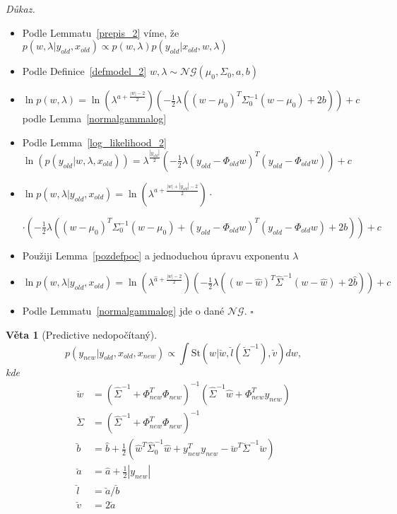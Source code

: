 \documentclass{article}
\newenvironment{pitemize}{
\begin{itemize}
  \setlength{\itemsep}{5pt}
  \setlength{\parskip}{0pt}
  \setlength{\parsep}{0pt}
}{\end{itemize}}
\newenvironment{pproof}{
\noindent\emph{Důkaz.}
\begin{pitemize}
}{\hfill$\square$\end{pitemize}}
\newcommand{\NoG}{\mathcal{NG}}
\newcommand{\St}{\mathrm{St}}
\newtheorem{veta}{Věta}
\theoremstyle{definition}
\begin{document}
\begin{pproof}
\item Podle Lemmatu~\ref{prepis_2} víme, že $p(w,\lambda|y_{old},x_{old})\propto p(w,\lambda)p(y_{old}|x_{old},w,\lambda)$
 
\item Podle Definice~\ref{defmodel_2} $w,\lambda\sim\NoG(\mu_0,\Sigma_0,a,b)$ 
\item $\ln p(w,\lambda)=
\ln\left(\lambda^{a+\frac{\left|w\right|-2}{2}}\right)
\left(-\frac{1}{2}\lambda\left(\left(w-\mu_0\right)^T \Sigma_0^{-1}\left(w- \mu_0\right)+2b\right)\right)+c$ podle Lemma~\ref{normalgammalog} 

\item Podle Lemma~\ref{log_likelihood_2} $\ln(p(y_{old}|w,\lambda,x_{old}))=\lambda^{\frac{\left|y_{old}\right|}{2}}\left(-\frac{1}{2}\lambda
\left(y_{old}-\Phi _{old}w\right)^T\left(y_{old}-\Phi _{old}w\right)\right)+c$

\item $\ln p(w,\lambda|y_{old},x_{old})=
\ln\left(\lambda^{a+\frac{\left|w\right|+\left|y_{old}\right|-2}{2}}\right)\cdot$

\nopagebreak

$\cdot\left(-\frac{1}{2}\lambda\left(\left(w-\mu_0\right)^T \Sigma_0^{-1}\left(w- \mu_0\right)+\left(y_{old}-\Phi _{old}w\right)^T\left(y_{old}-\Phi _{old}w\right)+2b\right)\right)+c
$

\item Použiji Lemma~\ref{pozdefpoc} a jednoduchou úpravu exponentu $\lambda$

\item $\ln p(w,\lambda|y_{old},x_{old})=
\ln\left(\lambda^{\hat{a}+\frac{\left|w\right|-2}{2}}\right) \left(-\frac{1}{2}\lambda\left(\left(w-\hat{w}\right)^T {\hat{\Sigma}}^{-1}\left(w- \hat{w}\right)+2\hat{b}\right)\right)+c
$
\item Podle Lemmatu~\ref{normalgammalog} jde o dané $\NoG$.
\end{pproof}

\begin{veta}[Predictive nedopočítaný]
$$p(y_{new}|y_{old},x_{old},x_{new})\propto\int\St\left(w|\breve w,\breve l\left(\breve \Sigma^{-1}\right),\breve v\right) dw,$$
kde 
\begin{align*}
\breve{w} &= (\hat \Sigma^{-1}+\Phi _{new}^T\Phi _{new})^{-1}(\hat \Sigma^{-1}\hat w+\Phi _{new}^Ty_{new}) \\
\breve{\Sigma} &= (\hat \Sigma^{-1}+\Phi _{new}^T\Phi _{new})^{-1} \\
\breve{b} &= \hat b+\frac{1}{2}(\hat w^T\hat \Sigma_0^{-1}\hat w+y_{new}^Ty_{new}
-\breve{w}^T\breve{\Sigma}^{-1}\breve{w})\\
\breve{a} &= \hat a+\frac{1}{2}\left|y_{new}\right|\\
\breve l &= \breve a / \breve b \\
\breve v  &= 2 \breve a
\end{align*}

\end{veta}
\end{document}
